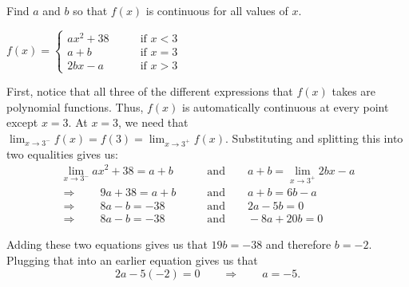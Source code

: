 \documentclass[handout,nooutcomes]{ximera}
\begin{document}
\begin{problem}
Find $a$ and $b$ so that $f(x)$ is continuous for all values of $x$.
	
	$f(x) =   \left\{ \begin{array}{ll}
	ax^2 + 38		 	&	\qquad \text{if } x < 3	\\
	a + b 				&	\qquad \text{if } x = 3	\\
	2bx - a			&	\qquad \text{if } x > 3	\end{array} \right.  $

	\begin{freeResponse}
	
	First, notice that all three of the different expressions that $f(x)$ takes are polynomial functions.  Thus, $f(x)$ is automatically continuous at every point except $x = 3$.  At $x = 3$, we need that $\lim_{x \to 3^-} f(x) = f(3) = \lim_{x \to 3^+} f(x)$.  Substituting and splitting this into two equalities gives us:
	\begin{align*}
	\lim_{x \to 3^-} ax^2 + 38 = a + b \qquad &\text{and} \qquad a + b = \lim_{x \to 3^+} 2bx-a  \\
	\Longrightarrow \qquad 9a + 38 = a + b \qquad &\text{and} \qquad a + b = 6b - a  \\
	\Longrightarrow \qquad 8a - b = -38 \qquad &\text{and} \qquad 2a - 5b = 0  \\
	\Longrightarrow \qquad 8a - b = -38 \qquad &\text{and} \qquad -8a + 20b = 0
	\end{align*}
	
	Adding these two equations gives us that $19b = -38$ and therefore $b = -2$.  Plugging that into an earlier equation gives us that 			$$2a - 5(-2) = 0 \qquad \Longrightarrow \qquad a = -5.$$
	
	\end{freeResponse}
\end{problem}
	
	
	
	
	
	
	
	
	
\end{document}
